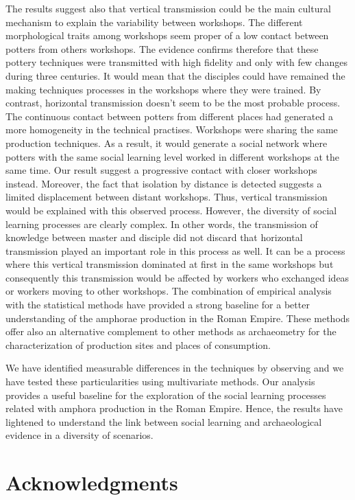 \documentclass[review]{elsarticle}
\begin{document}
The results suggest also that vertical transmission could be the main cultural mechanism to explain the variability between workshops. The different morphological traits among workshops seem proper of a low contact between potters from others workshops. The evidence confirms therefore that these pottery techniques were transmitted with high fidelity and only with few changes during three centuries. It would mean that the disciples could have remained the making techniques processes in the workshops where they were trained. By contrast, horizontal transmission doesn't seem to be the most probable process. The continuous contact between potters from different places had generated a more homogeneity in the technical practises. Workshops were sharing the same production techniques. As a result, it would generate a social network where potters with the same social learning level worked in different workshops at the same time. Our result suggest a progressive contact with closer workshops instead. Moreover, the fact that isolation by distance is detected suggests a limited displacement between distant workshops. Thus, vertical transmission would be explained with this observed process. However, the diversity of social learning processes are clearly complex. In other words, the transmission of knowledge between master and disciple did not discard that horizontal transmission played an important role in this process as well. It can be a process where this vertical transmission dominated at first in the same workshops but consequently this transmission would be affected by workers who exchanged ideas or workers moving to other workshops. The combination of empirical analysis with the statistical methods have provided a strong baseline for a better understanding of the amphorae production in the Roman Empire. These methods offer also an alternative complement to other methods as archaeometry for the characterization of production sites and places of consumption.  

We have identified measurable differences in the techniques by observing and we have tested these particularities using multivariate methods. Our analysis provides a useful baseline for the exploration of the social learning processes related with amphora production in the Roman Empire. Hence, the results have lightened to understand the link between social learning and archaeological evidence in a diversity of scenarios. 

\section{Acknowledgments}
\end{document}
